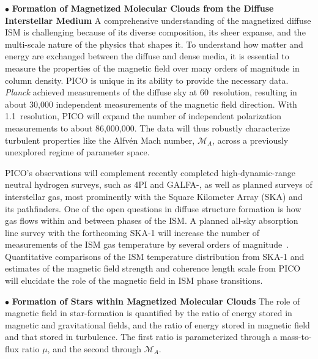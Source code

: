 \documentclass[PICOReport.tex]{subfiles}
\begin{document}
\noindent$\bullet$ {\bf Formation of Magnetized Molecular Clouds from the Diffuse Interstellar Medium} \hspace{0.1in}
A comprehensive understanding of the magnetized diffuse \ac{ISM} is challenging because of its diverse composition, its sheer expanse, and the multi-scale nature of the physics that shapes it. To understand how matter and energy are exchanged between the diffuse and dense media, it is essential to measure the properties of the magnetic field over many orders of magnitude  in column density. PICO is unique in its ability to provide the necessary data. \textit{Planck} achieved measurements of the diffuse sky at 60\arcmin\ resolution, resulting in about 30,000 independent measurements of the magnetic field direction.  With 1.1\arcmin~resolution, PICO will expand the number of independent polarization measurements to about 86,000,000. The data will thus robustly characterize turbulent properties like the Alfv\'{e}n Mach number, $\mathcal{M}_A$, across a previously unexplored regime of parameter space. 

PICO's observations will complement recently completed high-dynamic-range neutral hydrogen surveys, such as \HI4PI \citep{HI4PI:2016} and GALFA-\hi \citep{Peek:2018}, as well as planned surveys of interstellar gas, most prominently with the Square Kilometer Array (SKA) and its pathfinders. One of the open questions in diffuse structure formation is how gas flows within and between phases of the \ac{ISM}. A planned all-sky absorption line survey with the forthcoming SKA-1 will increase the number of measurements of the \ac{ISM} gas temperature by several orders of magnitude~\citep{McClure-Griffiths2015}. Quantitative comparisons of the \ac{ISM} temperature distribution from SKA-1 and estimates of the magnetic field strength and coherence length scale from PICO will elucidate the role of the magnetic field in \ac{ISM} phase transitions.

\noindent$\bullet$ {\bf Formation of Stars within Magnetized Molecular Clouds} \hspace{0.1in}
The role of magnetic field in star-formation is quantified by the ratio of energy stored in magnetic and gravitational fields, and the ratio of energy stored in magnetic field and that stored in turbulence. The first ratio is parameterized through a mass-to-flux ratio $\mu$, and the second
through $\mathcal{M}_A$. 
\end{document}
